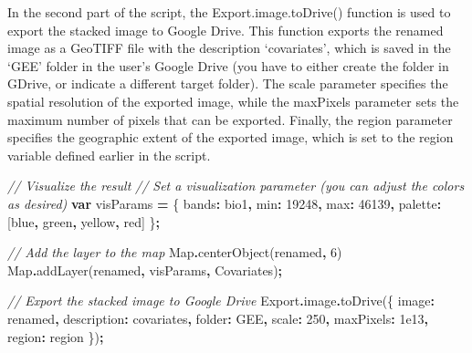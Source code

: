 \documentclass[
  10pt,
  b5paper,
  oneside]{book}
\newenvironment{Shaded}{\begin{snugshade}}{\end{snugshade}}
\newcommand{\AttributeTok}[1]{\textcolor[rgb]{0.77,0.63,0.00}{#1}}
\newcommand{\BuiltInTok}[1]{#1}
\newcommand{\CommentTok}[1]{\textcolor[rgb]{0.56,0.35,0.01}{\textit{#1}}}
\newcommand{\DataTypeTok}[1]{\textcolor[rgb]{0.13,0.29,0.53}{#1}}
\newcommand{\DecValTok}[1]{\textcolor[rgb]{0.00,0.00,0.81}{#1}}
\newcommand{\FloatTok}[1]{\textcolor[rgb]{0.00,0.00,0.81}{#1}}
\newcommand{\FunctionTok}[1]{\textcolor[rgb]{0.00,0.00,0.00}{#1}}
\newcommand{\KeywordTok}[1]{\textcolor[rgb]{0.13,0.29,0.53}{\textbf{#1}}}
\newcommand{\NormalTok}[1]{#1}
\newcommand{\OperatorTok}[1]{\textcolor[rgb]{0.81,0.36,0.00}{\textbf{#1}}}
\newcommand{\StringTok}[1]{\textcolor[rgb]{0.31,0.60,0.02}{#1}}
\begin{document}
In the second part of the script, the Export.image.toDrive() function is used to export the stacked image to Google Drive. This function exports the renamed image as a GeoTIFF file with the description `covariates', which is saved in the `GEE' folder in the user's Google Drive (you have to either create the folder in GDrive, or indicate a different target folder). The scale parameter specifies the spatial resolution of the exported image, while the maxPixels parameter sets the maximum number of pixels that can be exported. Finally, the region parameter specifies the geographic extent of the exported image, which is set to the region variable defined earlier in the script.

\begin{Shaded}
\begin{Highlighting}[]
\CommentTok{// Visualize the result}
\CommentTok{// Set a visualization parameter (you can adjust the colors as desired)}
\KeywordTok{var}\NormalTok{ visParams }\OperatorTok{=}\NormalTok{ \{}
  \DataTypeTok{bands}\OperatorTok{:} \StringTok{\textquotesingle{}bio1\textquotesingle{}}\OperatorTok{,}
  \DataTypeTok{min}\OperatorTok{:} \DecValTok{19248}\OperatorTok{,}
  \DataTypeTok{max}\OperatorTok{:} \DecValTok{46139}\OperatorTok{,}
  \DataTypeTok{palette}\OperatorTok{:}\NormalTok{ [}\StringTok{\textquotesingle{}blue\textquotesingle{}}\OperatorTok{,} \StringTok{\textquotesingle{}green\textquotesingle{}}\OperatorTok{,} \StringTok{\textquotesingle{}yellow\textquotesingle{}}\OperatorTok{,} \StringTok{\textquotesingle{}red\textquotesingle{}}\NormalTok{]}
\NormalTok{\}}\OperatorTok{;}

\CommentTok{// Add the layer to the map}
\BuiltInTok{Map}\OperatorTok{.}\FunctionTok{centerObject}\NormalTok{(renamed}\OperatorTok{,} \DecValTok{6}\NormalTok{)}
\BuiltInTok{Map}\OperatorTok{.}\FunctionTok{addLayer}\NormalTok{(renamed}\OperatorTok{,}\NormalTok{ visParams}\OperatorTok{,} \StringTok{\textquotesingle{}Covariates\textquotesingle{}}\NormalTok{)}\OperatorTok{;}


\CommentTok{// Export the stacked image to Google Drive}
\NormalTok{Export}\OperatorTok{.}\AttributeTok{image}\OperatorTok{.}\FunctionTok{toDrive}\NormalTok{(\{}
  \DataTypeTok{image}\OperatorTok{:}\NormalTok{ renamed}\OperatorTok{,}
  \DataTypeTok{description}\OperatorTok{:} \StringTok{\textquotesingle{}covariates\textquotesingle{}}\OperatorTok{,}
  \DataTypeTok{folder}\OperatorTok{:} \StringTok{\textquotesingle{}GEE\textquotesingle{}}\OperatorTok{,}
  \DataTypeTok{scale}\OperatorTok{:} \DecValTok{250}\OperatorTok{,}
  \DataTypeTok{maxPixels}\OperatorTok{:} \FloatTok{1e13}\OperatorTok{,}
  \DataTypeTok{region}\OperatorTok{:}\NormalTok{ region}
\NormalTok{\})}\OperatorTok{;}
\end{Highlighting}
\end{Shaded}
\end{document}
